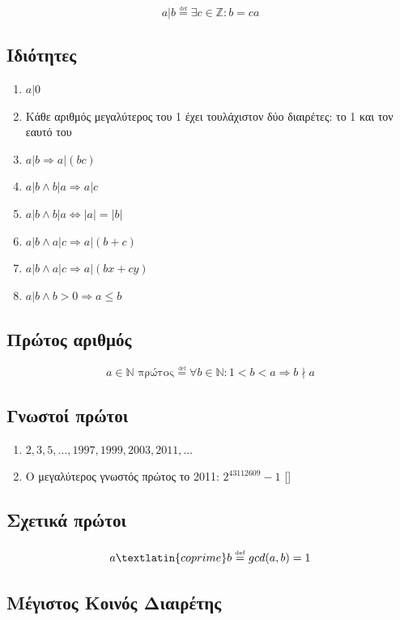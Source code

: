 \documentclass[11pt,a4paper]{book}
\newcommand{\defeq}{\overset{\underset{\mathrm{def}}{}}{=}}
\begin{document}
\[
a|b \defeq  \exists c \in \mathbb{Z}: b = ca
\]

\subsection*{Ιδιότητες}

\begin{enumerate}
	\item $ a | 0 $
	\item Κάθε αριθμός μεγαλύτερος του 1 έχει τουλάχιστον δύο διαιρέτες: το 1 και τον εαυτό του
	\item $ a|b \Rightarrow a | (bc) $
	\item $ a|b \land b|a \Rightarrow a|c $
	\item $ a|b \land b|a \Leftrightarrow |a| = |b| $
	\item $ a|b \land a|c \Rightarrow a | ( b + c ) $
	\item $ a|b \land a|c \Rightarrow a | (bx + cy) $
	\item $ a|b \land b>0 \Rightarrow a \leq b$
\end{enumerate}

\subsection*{Πρώτος αριθμός}

\[
a \in \mathbb{N} \text{ πρώτος} \defeq \forall b \in \mathbb{N}: 1 < b < a \Rightarrow b \nmid a
\]

\subsection*{Γνωστοί πρώτοι}
\begin{enumerate}
	\item $2, 3, 5, ..., 1997, 1999, 2003, 2011, ...$
	\item Ο μεγαλύτερος γνωστός πρώτος το 2011: $2^{43112609} - 1$ []
\end{enumerate}

\subsection*{Σχετικά πρώτοι}

\[
a \textlatin{ coprime } b \defeq gcd( a, b ) = 1
\]

\subsection*{Μέγιστος Κοινός Διαιρέτης}
\end{document}
